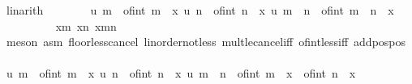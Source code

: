 \begin{isabellebody}
\ linarith{\isacharplus}{\kern0pt}\isanewline
\ \ \ \ \ \ \isamarkupfalse%
\ {\isachardoublequoteopen}u\ m\ {\isasymle}\ {\isasymlfloor}of{\isacharunderscore}{\kern0pt}int\ m\ {\isacharasterisk}{\kern0pt}\ x{\isasymrfloor}{\isachardoublequoteclose}\ {\isachardoublequoteopen}u\ n\ {\isasymle}\ {\isasymlfloor}of{\isacharunderscore}{\kern0pt}int\ n\ {\isacharasterisk}{\kern0pt}\ x{\isasymrfloor}{\isachardoublequoteclose}\ {\isachardoublequoteopen}u\ {\isacharparenleft}{\kern0pt}m\ {\isacharplus}{\kern0pt}\ n{\isacharparenright}{\kern0pt}\ {\isasymle}\ {\isasymlfloor}of{\isacharunderscore}{\kern0pt}int\ {\isacharparenleft}{\kern0pt}m\ {\isacharplus}{\kern0pt}\ n{\isacharparenright}{\kern0pt}\ {\isacharasterisk}{\kern0pt}\ x{\isasymrfloor}{\isachardoublequoteclose}\ \isanewline
\ \ \ \ \ \ \ \ \isamarkupfalse%
\ x{\isacharunderscore}{\kern0pt}m\ x{\isacharunderscore}{\kern0pt}n\ x{\isacharunderscore}{\kern0pt}m{\isacharunderscore}{\kern0pt}n\ \isamarkupfalse%
\ {\isacharparenleft}{\kern0pt}meson\ asm\ floor{\isacharunderscore}{\kern0pt}less{\isacharunderscore}{\kern0pt}cancel\ linorder{\isacharunderscore}{\kern0pt}not{\isacharunderscore}{\kern0pt}less\ mult{\isacharunderscore}{\kern0pt}le{\isacharunderscore}{\kern0pt}cancel{\isacharunderscore}{\kern0pt}iff{}\ of{\isacharunderscore}{\kern0pt}int{\isacharunderscore}{\kern0pt}{}{\isacharunderscore}{\kern0pt}less{\isacharunderscore}{\kern0pt}iff\ add{\isacharunderscore}{\kern0pt}pos{\isacharunderscore}{\kern0pt}pos{\isacharparenright}{\kern0pt}{\isacharplus}{\kern0pt}\ \ \ \ \ \ \ \isanewline
\ \ \ \ \ \ \isamarkupfalse%
\ {\isachardoublequoteopen}u\ m\ {\isacharequal}{\kern0pt}\ {\isasymlfloor}of{\isacharunderscore}{\kern0pt}int\ m\ {\isacharasterisk}{\kern0pt}\ x{\isasymrfloor}{\isachardoublequoteclose}\ {\isachardoublequoteopen}u\ n\ {\isacharequal}{\kern0pt}\ {\isasymlfloor}of{\isacharunderscore}{\kern0pt}int\ n\ {\isacharasterisk}{\kern0pt}\ x{\isasymrfloor}{\isachardoublequoteclose}\ {\isachardoublequoteopen}u\ {\isacharparenleft}{\kern0pt}m\ {\isacharplus}{\kern0pt}\ n{\isacharparenright}{\kern0pt}\ {\isacharequal}{\kern0pt}\ {\isasymlfloor}of{\isacharunderscore}{\kern0pt}int\ m\ {\isacharasterisk}{\kern0pt}\ x\ {\isacharplus}{\kern0pt}\ of{\isacharunderscore}{\kern0pt}int\ n\ {\isacharasterisk}{\kern0pt}\ x{\isasymrfloor}{\isachardoublequoteclose}\ \isanewline
\ \ \ \ \ \ \ \ \isamarkupfalse%

\end{isabellebody}

